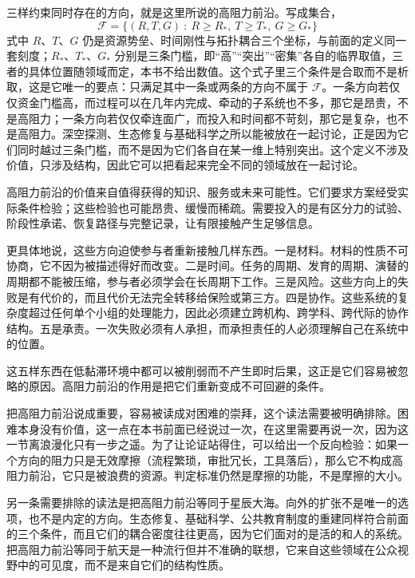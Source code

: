 三样约束同时存在的方向，就是这里所说的高阻力前沿。写成集合，
\begin{equation}
\mathcal{F}=\bigl\{(R,T,G)\ :\ R\ge R_{*},\ T\ge T_{*},\ G\ge G_{*}\bigr\}
\label{eq:frontier}
\end{equation}
式中 $R$、$T$、$G$ 仍是资源势垒、时间刚性与拓扑耦合三个坐标，与前面的定义同一套刻度；$R_{*}$、$T_{*}$、$G_{*}$ 分别是三条门槛，即“高”“突出”“密集”各自的临界取值，三者的具体位置随领域而定，本书不给出数值。这个式子里三个条件是合取而不是析取，这是它唯一的要点：只满足其中一条或两条的方向不属于 $\mathcal{F}$。一条方向若仅仅资金门槛高，而过程可以在几年内完成、牵动的子系统也不多，那它是昂贵，不是高阻力；一条方向若仅仅牵连面广，而投入和时间都不苛刻，那它是复杂，也不是高阻力。深空探测、生态修复与基础科学之所以能被放在一起讨论，正是因为它们同时越过三条门槛，而不是因为它们各自在某一维上特别突出。这个定义不涉及价值，只涉及结构，因此它可以把看起来完全不同的领域放在一起讨论。


高阻力前沿的价值来自值得获得的知识、服务或未来可能性。它们要求方案经受实际条件检验；这些检验也可能昂贵、缓慢而稀疏。需要投入的是有区分力的试验、阶段性承诺、恢复路径与完整记录，让有限接触产生足够信息。

更具体地说，这些方向迫使参与者重新接触几样东西。一是材料。材料的性质不可协商，它不因为被描述得好而改变。二是时间。任务的周期、发育的周期、演替的周期都不能被压缩，参与者必须学会在长周期下工作。三是风险。这些方向上的失败是有代价的，而且代价无法完全转移给保险或第三方。四是协作。这些系统的复杂度超过任何单个小组的处理能力，因此必须建立跨机构、跨学科、跨代际的协作结构。五是承责。一次失败必须有人承担，而承担责任的人必须理解自己在系统中的位置。

这五样东西在低黏滞环境中都可以被削弱而不产生即时后果，这正是它们容易被忽略的原因。高阻力前沿的作用是把它们重新变成不可回避的条件。


把高阻力前沿说成重要，容易被读成对困难的崇拜，这个读法需要被明确排除。困难本身没有价值，这一点在本书前面已经说过一次，在这里需要再说一次，因为这一节离浪漫化只有一步之遥。为了让论证站得住，可以给出一个反向检验：如果一个方向的阻力只是无效摩擦（流程繁琐，审批冗长，工具落后），那么它不构成高阻力前沿，它只是被浪费的资源。判定标准仍然是摩擦的功能，不是摩擦的大小。

另一条需要排除的读法是把高阻力前沿等同于星辰大海。向外的扩张不是唯一的选项，也不是内定的方向。生态修复、基础科学、公共教育制度的重建同样符合前面的三个条件，而且它们的耦合密度往往更高，因为它们面对的是活的和人的系统。把高阻力前沿等同于航天是一种流行但并不准确的联想，它来自这些领域在公众视野中的可见度，而不是来自它们的结构性质。

